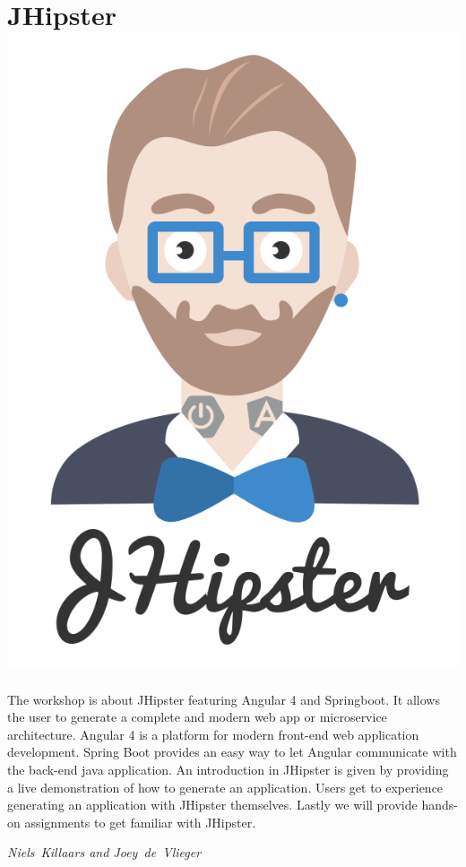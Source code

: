 
\section*{JHipster\hfill\includegraphics[width=.35\linewidth]{images/jhipster.png}}
The workshop is about JHipster featuring Angular 4 and Springboot. It
allows the user to generate a complete and modern web app or
microservice architecture. Angular 4 is a platform for modern
front-end web application development. Spring Boot provides an easy
way to let Angular communicate with the back-end java application. An
introduction in JHipster is given by providing a live demonstration of
how to generate an application. Users get to experience generating an
application with JHipster themselves. Lastly we will provide hands-on
assignments to get familiar with JHipster.

\hfill\textit{Niels~Killaars and Joey~de~Vlieger}

